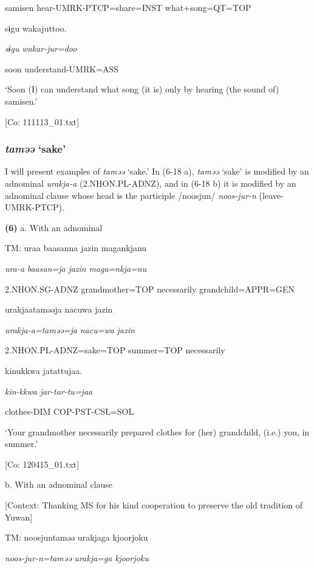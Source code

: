       samisen  hear-UMRK-PTCP=share=INST  what+song=QT=TOP

      sɨgu  wakajuttoo.

      \textit{sɨgu}  \textit{wakar-jur=doo}

      soon  understand-UMRK=ASS

      ‘Soon (I) can understand what song (it is) only by hearing (the sound of) samisen.’

      [Co: 111113\_01.txt]

\subsubsection{\textit{taməə} ‘sake’}

I will present examples of \textit{taməə} ‘sake.’ In (6-18 a), \textit{taməə} ‘sake’ is modified by an adnominal \textit{urakja-a} (2.NHON.PL-ADNZ), and in (6-18 b) it is modified by an adnominal clause whose head is the participle /noosjun/ \textit{noos-jur-n} (leave-UMRK-PTCP).

\textbf{(6)}  a.  With an adnominal

    TM:  uraa  baasanna  jazin  magankjanu

      \textit{ura-a}  \textit{baasan=ja}  \textit{jazin}  \textit{maga=nkja=nu}

      2.NHON.SG-ADNZ  grandmother=TOP  necessarily  grandchild=APPR=GEN

      urakjaataməəja  {\textbar}nacuwa{\textbar}  jazin

      \textit{urakja-a=taməə=ja}  \textit{nacu=wa}  \textit{jazin}

      2.NHON.PL-ADNZ=sake=TOP  summer=TOP  necessarily

      kinukkwa  jatattujaa.

      \textit{kin-kkwa}  \textit{jar-tar-tu=jaa}

      clothes-DIM  COP-PST-CSL=SOL

      ‘Your grandmother necessarily prepared clothes for (her) grandchild, (i.e.) you, in summer.’

      [Co: 120415\_01.txt]

  b.  With an adnominal clause

    [Context: Thanking MS for his kind cooperation to preserve the old tradition of Yuwan]

    TM:  noosjuntaməə  urakjaga  {\textbar}kjoorjoku{\textbar}

      \textit{noos-jur-n=taməə}  \textit{urakja=ga}  \textit{kjoorjoku}

